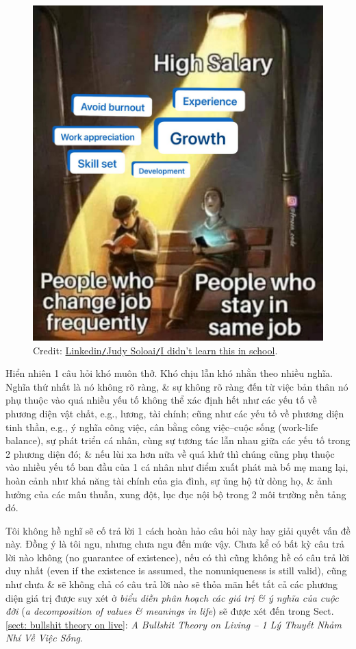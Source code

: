 \documentclass[12pt]{article}
\begin{document}
\begin{figure}[H]
	\centering
	\includegraphics[scale=.15]{high_salary}
	\caption{Credit: \href{https://www.linkedin.com/posts/judy-soloai_i-didnt-learn-this-in-school-i-learned-activity-7089014937494179840-jTze/}{Linkedin{\tt/}Judy Soloai{\tt/}I didn't learn this in school}.}
\end{figure}
Hiển nhiên 1 câu hỏi khó muôn thở. Khó chịu lẫn khó nhằn theo nhiều nghĩa. Nghĩa thứ nhất là nó không rõ ràng, \& sự không rõ ràng đến từ việc bản thân nó phụ thuộc vào quá nhiều yếu tố không thể xác định hết như các yếu tố về phương diện vật chất, e.g., lương, tài chính; cũng như các yếu tố về phương diện tinh thần, e.g., ý nghĩa công việc, cân bằng công việc--cuộc sống (work-life balance), sự phát triển cá nhân, cùng sự tương tác lẫn nhau giữa các yếu tố trong 2 phương diện đó; \& nếu lùi xa hơn nữa về quá khứ thì chúng cũng phụ thuộc vào nhiều yếu tố ban đầu của 1 cá nhân như điểm xuất phát mà bố mẹ mang lại, hoàn cảnh như khả năng tài chính của gia đình, sự ủng hộ từ dòng họ, \& ảnh hưởng của các mâu thuẫn, xung đột, lục đục nội bộ trong 2 môi trường nền tảng đó.

Tôi không hề nghĩ sẽ cố trả lời 1 cách hoàn hảo câu hỏi này hay giải quyết vấn đề này. Đồng ý là tôi ngu, nhưng chưa ngu đến mức vậy. Chưa kể có bất kỳ câu trả lời nào không (no guarantee of existence), nếu có thì cũng không hề có câu trả lời duy nhất (even if the existence is assumed, the nonuniqueness is still valid), cũng như chưa \& sẽ không chả có câu trả lời nào sẽ thỏa mãn hết tất cả các phương diện giá trị được suy xét ở {\it biểu diễn phân hoạch các giá trị \& ý nghĩa của cuộc đời} ({\it a decomposition of values \& meanings in life}) sẽ được xét đến trong Sect. \ref{sect: bullshit theory on live}: {\it A Bullshit Theory on Living -- 1 Lý Thuyết Nhảm Nhí Về Việc Sống}.
\end{document}
